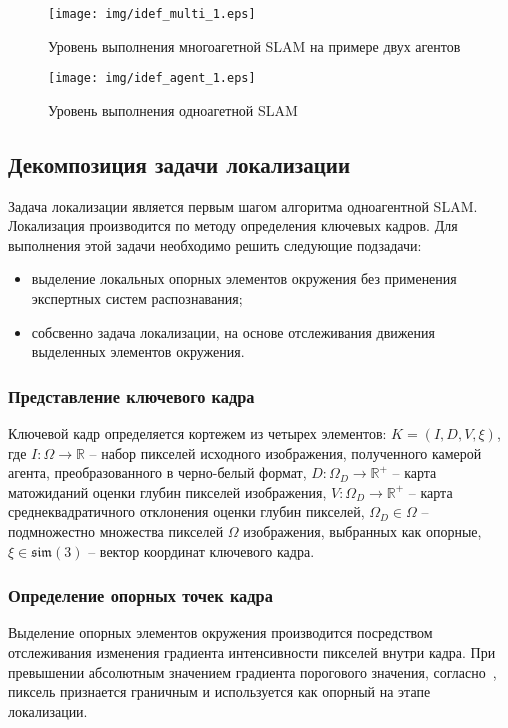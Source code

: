 \begin{figure}[H]
\texttt{[image: img/idef\_multi\_1.eps]}
\caption{Уровень выполнения многоагетной SLAM на примере двух агентов}
\label{idef01}
\end{figure}

\begin{figure}[H]
\texttt{[image: img/idef\_agent\_1.eps]}
\caption{Уровень выполнения одноагетной SLAM}
\label{idef02}
\end{figure}

\subsection{Декомпозиция задачи локализации}
Задача локализации является первым шагом алгоритма одноагентной SLAM. Локализация производится по методу определения ключевых кадров. Для выполнения этой задачи необходимо решить следующие подзадачи:
\begin{itemize}
    \item выделение локальных опорных элементов окружения без применения экспертных систем распознавания;
    \item собсвенно задача локализации, на основе отслеживания движения выделенных элементов окружения.
\end{itemize}


\subsubsection{Представление ключевого кадра}
Ключевой кадр определяется кортежем из четырех элементов: $K = (I, D, V, \xi)$, где $I: \Omega \rightarrow \mathbb{R}$ -- набор пикселей исходного изображения, полученного камерой агента, преобразованного в черно-белый формат, $D: \Omega_D \rightarrow \mathbb{R}^+$ -- карта матожиданий оценки глубин пикселей изображения, $V: \Omega_D \rightarrow \mathbb{R}^+$ -- карта среднеквадратичного отклонения оценки глубин пикселей, $\Omega_D \in \Omega$ -- подмножестно множества пикселей $\Omega$ изображения, выбранных как опорные, $\xi \in \mathfrak{sim}(3)$ -- вектор координат ключевого кадра.


\subsubsection{Определение опорных точек кадра}
Выделение опорных элементов окружения производится посредством отслеживания изменения градиента интенсивности пикселей внутри кадра. При превышении абсолютным значением градиента порогового значения, согласно~\cite{tum3DMonoSLAM}, пиксель признается граничным и используется как опорный на этапе локализации.



